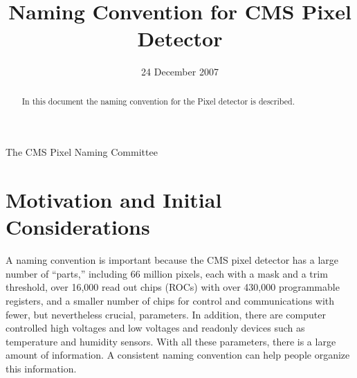\documentclass{cmspaper}
\begin{document}

\begin{titlepage}

\setlength{\topmargin}{20mm}

   \date{24 December 2007}

  \title{Naming Convention for CMS Pixel Detector}

  \begin{Authlist}
    The CMS Pixel Naming Committee
  \end{Authlist}



  \begin{abstract}
\begin{center}
In this document the  naming convention for the Pixel detector is 
described.  
\end{center}
  \end{abstract} 

  
\end{titlepage}

\setcounter{page}{2}%

\section{Motivation and Initial Considerations}

A naming convention  is important because the CMS pixel detector has a large 
number of ``parts,'' including 66 million pixels, each with a mask and a trim 
threshold,
over 16,000 read out chips (ROCs) with over 430,000 programmable registers,
and a smaller number of chips for control and communications
with fewer, but nevertheless crucial, parameters.
In addition, there are computer controlled high voltages and low voltages
and readonly devices such as temperature and humidity sensors.
With all these parameters,
there is a large amount of information. A consistent naming convention can
help people organize this information.
\end{document}
